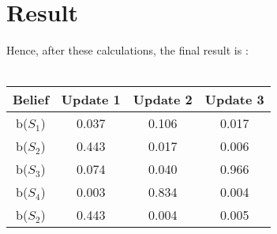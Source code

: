 \documentclass[10pt,letterpaper]{article}
\begin{document}
\section*{Result}
Hence, after these calculations, the final result is :\\\\
\begin{tabular}{|c|c|c|c|}
    \hline
    Belief & Update 1 & Update 2 & Update 3\\
    \hline
    b($S_1$) & 0.037 & 0.106 & 0.017\\
    \hline
    b($S_2$) & 0.443 & 0.017 & 0.006\\
    \hline
    b($S_3$) & 0.074 & 0.040 & 0.966\\
    \hline
    b($S_4$) & 0.003 & 0.834 & 0.004\\
    \hline
    b($S_2$) & 0.443 & 0.004 & 0.005\\
    \hline
\end{tabular}
\end{document}
